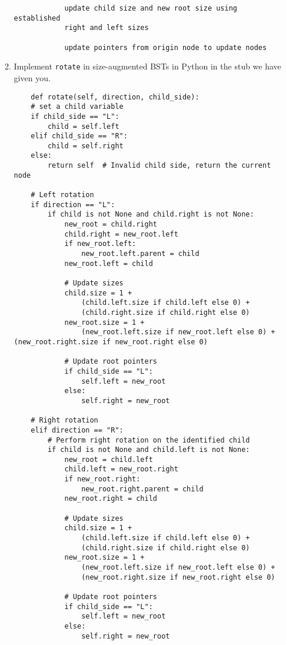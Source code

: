 \documentclass[11pt]{article}
\begin{document}
\begin{enumerate}
\begin{enumerate}
\begin{verbatim}
            update child size and new root size using established 
            right and left sizes

            update pointers from origin node to update nodes
\end{verbatim}
        \item Implement \texttt{rotate} in size-augmented BSTs in Python in the stub we have given you.

\begin{verbatim}
    def rotate(self, direction, child_side):
    # set a child variable
    if child_side == "L":
        child = self.left
    elif child_side == "R":
        child = self.right
    else:
        return self  # Invalid child side, return the current node

    # Left rotation
    if direction == "L":
        if child is not None and child.right is not None:
            new_root = child.right
            child.right = new_root.left
            if new_root.left:
                new_root.left.parent = child
            new_root.left = child
            
            # Update sizes
            child.size = 1 + 
                (child.left.size if child.left else 0) + 
                (child.right.size if child.right else 0)
            new_root.size = 1 + 
                (new_root.left.size if new_root.left else 0) + (new_root.right.size if new_root.right else 0)
            
            # Update root pointers 
            if child_side == "L":
                self.left = new_root
            else:
                self.right = new_root

    # Right rotation
    elif direction == "R":
        # Perform right rotation on the identified child
        if child is not None and child.left is not None:
            new_root = child.left
            child.left = new_root.right
            if new_root.right:
                new_root.right.parent = child
            new_root.right = child
            
            # Update sizes
            child.size = 1 + 
                (child.left.size if child.left else 0) + 
                (child.right.size if child.right else 0)
            new_root.size = 1 + 
                (new_root.left.size if new_root.left else 0) +
                (new_root.right.size if new_root.right else 0)
            
            # Update root pointers 
            if child_side == "L":
                self.left = new_root
            else:
                self.right = new_root
    

\end{verbatim}
\end{enumerate}
\end{enumerate}
\end{document}
